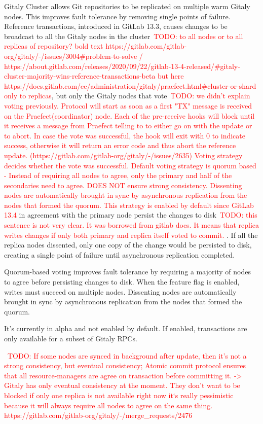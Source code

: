 \documentclass[sigplan, screen, nonacm, 11pt]{acmart}
\newcommand{\todo}[1]{\textcolor{red}{TODO: #1}}
\begin{document}
Gitaly Cluster allows Git repositories to be replicated on multiple warm Gitaly nodes.
This improves fault tolerance by removing single points of failure.
Reference transactions, introduced in GitLab 13.3,
causes changes to be broadcast to all the Gitaly nodes in the cluster~\todo{to all nodes or to all replicas of repository? bold text https://gitlab.com/gitlab-org/gitaly/-/issues/3004\#problem-to-solve / https://about.gitlab.com/releases/2020/09/22/gitlab-13-4-released/\#gitaly-cluster-majority-wins-reference-transactions-beta but here https://docs.gitlab.com/ee/administration/gitaly/praefect.html\#cluster-or-shard only to replicas},
but only the Gitaly nodes that vote~\todo{we didn't explain voting previously.
Protocol will start as soon as a first "TX" message is received on the Praefect(coordinator) node.  Each of the pre-receive hooks will block until it receives a message from Praefect telling to to either go on with the update or to abort. In case the vote was successful, the hook will exit with 0 to indicate success, otherwise it will return an error code and thus abort the reference update.
(https://gitlab.com/gitlab-org/gitaly/-/issues/2635)
Voting strategy decides whether the vote was successful.
Default voting strategy is quorum based - Instead of requiring all nodes to agree, only the primary and half of the secondaries need to agree. DOES NOT ensure strong consistency.
Dissenting nodes are automatically brought in sync by asynchronous replication from the nodes that formed the quorum.
This strategy is enabled by default since GitLab 13.4}
in agreement with the primary node persist the changes to disk~\todo{this sentence is not very clear. It was borrowed from gitlab docs. It means that replica writes changes if only both primary and replica itself voted to commit. }.
If all the replica nodes dissented, only one copy of the change would be persisted to disk,
creating a single point of failure until asynchronous replication completed.

Quorum-based voting improves fault tolerance by requiring a majority of nodes to agree before persisting changes to disk.
When the feature flag is enabled, writes must succeed on multiple nodes.
Dissenting nodes are automatically brought in sync by asynchronous replication from the nodes that formed the quorum.

It's currently in alpha and not enabled by default.
If enabled, transactions are only available for a subset of Gitaly RPCs.

~\todo{If some nodes are synced in background after update, then it's not a strong consistency, but eventual consistency;
Atomic commit protocol ensures that all resource-managers are agree on transaction before committing it. -> Gitaly has only eventual consistency at the moment. They don't want to be blocked if only one replica is not available
right now it`s really pessimistic because it will always require all nodes to agree on the same thing. https://gitlab.com/gitlab-org/gitaly/-/merge\_requests/2476}
\end{document}

